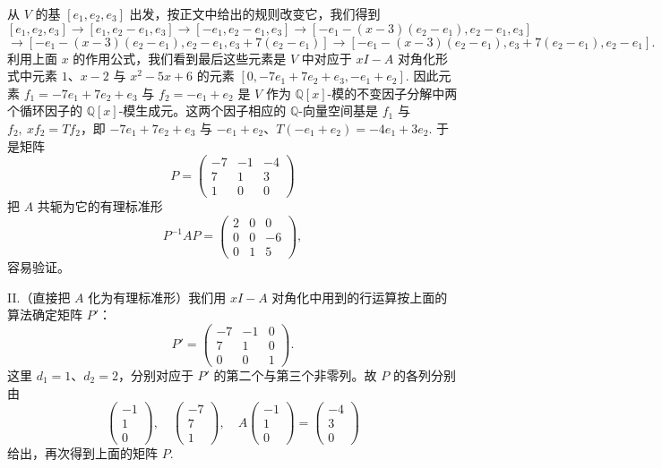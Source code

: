 \begin{example}
从 \(V\) 的基 \([e_1, e_2, e_3]\) 出发，按正文中给出的规则改变它，我们得到
\[
[e_1, e_2, e_3] \to [e_1, e_2-e_1, e_3] \to [-e_1, e_2-e_1, e_3] \to [-e_1-(x-3)(e_2-e_1), e_2-e_1, e_3]
\]
\[
\to [-e_1-(x-3)(e_2-e_1), e_2-e_1, e_3+7(e_2-e_1)] \to [-e_1-(x-3)(e_2-e_1), e_3+7(e_2-e_1), e_2-e_1].
\]
利用上面 \(x\) 的作用公式，我们看到最后这些元素是 \(V\) 中对应于 \(xI-A\) 对角化形式中元素 \(1\)、\(x-2\) 与 \(x^2-5x+6\) 的元素 \([0, -7e_1+7e_2+e_3, -e_1+e_2]\). 因此元素 \(f_1 = -7e_1+7e_2+e_3\) 与 \(f_2 = -e_1+e_2\) 是 \(V\) 作为 \(\mathbb{Q}[x]\)-模的不变因子分解中两个循环因子的 \(\mathbb{Q}[x]\)-模生成元。这两个因子相应的 \(\mathbb{Q}\)-向量空间基是 \(f_1\) 与 \(f_2,\ xf_2 = Tf_2\)，即 \(-7e_1+7e_2+e_3\) 与 \(-e_1+e_2\)、\(T(-e_1+e_2) = -4e_1+3e_2\). 于是矩阵
\[
P = \begin{pmatrix} -7 & -1 & -4 \\ 7 & 1 & 3 \\ 1 & 0 & 0 \end{pmatrix}
\]
把 \(A\) 共轭为它的有理标准形
\[
P^{-1}AP = \begin{pmatrix} 2 & 0 & 0 \\ 0 & 0 & -6 \\ 0 & 1 & 5 \end{pmatrix},
\]
容易验证。

\noindent II.（直接把 \(A\) 化为有理标准形）我们用 \(xI-A\) 对角化中用到的行运算按上面的算法确定矩阵 \(P'\)：
\[
P' = \begin{pmatrix} -7 & -1 & 0 \\ 7 & 1 & 0 \\ 0 & 0 & 1 \end{pmatrix}.
\]
这里 \(d_1 = 1\)、\(d_2 = 2\)，分别对应于 \(P'\) 的第二个与第三个非零列。故 \(P\) 的各列分别由
\[
\begin{pmatrix} -1 \\ 1 \\ 0 \end{pmatrix},\quad \begin{pmatrix} -7 \\ 7 \\ 1 \end{pmatrix},\quad A\begin{pmatrix} -1 \\ 1 \\ 0 \end{pmatrix} = \begin{pmatrix} -4 \\ 3 \\ 0 \end{pmatrix}
\]
给出，再次得到上面的矩阵 \(P\).


\end{example}

